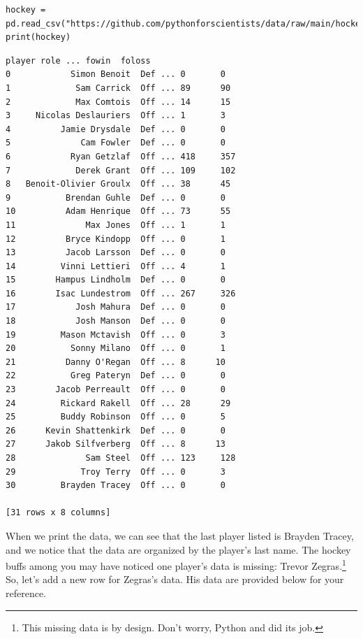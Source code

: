 \begin{lstlisting}[style=pippython]
hockey = pd.read_csv("https://github.com/pythonforscientists/data/raw/main/hockey.csv")
print(hockey)
\end{lstlisting}
\begin{lstlisting}[style=none]
                   player role ... fowin  foloss
0            Simon Benoit  Def ... 0       0
1             Sam Carrick  Off ... 89      90
2             Max Comtois  Off ... 14      15
3     Nicolas Deslauriers  Off ... 1       3
4          Jamie Drysdale  Def ... 0       0
5              Cam Fowler  Def ... 0       0
6            Ryan Getzlaf  Off ... 418     357
7             Derek Grant  Off ... 109     102
8   Benoit-Olivier Groulx  Off ... 38      45
9           Brendan Guhle  Def ... 0       0
10          Adam Henrique  Off ... 73      55
11              Max Jones  Off ... 1       1
12          Bryce Kindopp  Off ... 0       1
13          Jacob Larsson  Def ... 0       0
14         Vinni Lettieri  Off ... 4       1
15        Hampus Lindholm  Def ... 0       0
16        Isac Lundestrom  Off ... 267     326
17            Josh Mahura  Def ... 0       0
18            Josh Manson  Def ... 0       0
19         Mason Mctavish  Off ... 0       3
20           Sonny Milano  Off ... 0       1
21          Danny O'Regan  Off ... 8      10
22           Greg Pateryn  Def ... 0       0
23        Jacob Perreault  Off ... 0       0
24         Rickard Rakell  Off ... 28      29
25         Buddy Robinson  Off ... 0       5
26      Kevin Shattenkirk  Def ... 0       0
27      Jakob Silfverberg  Off ... 8      13
28              Sam Steel  Off ... 123     128
29             Troy Terry  Off ... 0       3
30         Brayden Tracey  Off ... 0       0

[31 rows x 8 columns]
\end{lstlisting}
When we print the data, we can see that the last player listed is Brayden Tracey, and we notice that the data are organized by the player's last name. The hockey buffs among you may have noticed one player's data is missing: Trevor Zegras.\footnote{This missing data is by design. Don't worry, Python and  did its job.} So, let's add a new row for Zegras's data. His data are provided below for your reference.\par
\vspace{5mm}
